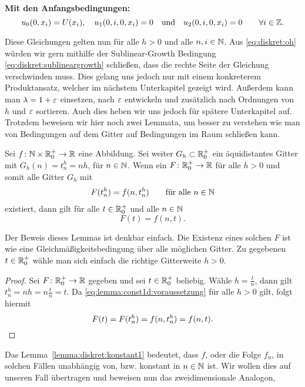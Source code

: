 \vspace{0.4cm}
\noindent \textbf{Mit den Anfangsbedingungen:}
\[ u_0(0, x_i) = U(x_i), \quad u_1(0, i, 0, x_i) = 0 \quad \text{und} \quad u_2(0, i, 0, x_i) = 0 \qquad \forall i \in \mathbb Z. \]

Diese Gleichungen gelten nun für alle $h > 0$ und alle $n, i \in \mathbb N$.
Aus \eqref{eq:diskret:oh} würden wir gern mithilfe der Sublinear-Growth Bedingung \eqref{eq:diskret:sublineargrowth} schließen, dass die rechte Seite der Gleichung verschwinden muss.
Dies gelang uns jedoch nur mit einem konkreterem Produktansatz, welcher im nächstem Unterkapitel gezeigt wird.
Außerdem kann man $\lambda = 1 + \varepsilon$ einsetzen, nach $\varepsilon$ entwickeln und zusätzlich nach Ordnungen von $h$ und $\varepsilon$ sortieren.
Auch dies heben wir uns jedoch für spätere Unterkapitel auf.
Trotzdem beweisen wir hier noch zwei Lemmata, um besser zu verstehen wie man von Bedingungen auf dem Gitter auf Bedingungen im Raum schließen kann.

\begin{lemma} \label{lemma:diskret:konstant1}
Sei $f\colon \mathbb N \times \mathbb R^+_0 \to \mathbb R$ eine Abbildung.
Sei weiter $G_h \subset \mathbb R^+_0$ ein äquidistantes Gitter mit $G_h(n) = t^h_n = n h$, für $n \in \mathbb N$.
Wenn ein $F\colon \mathbb R^+_0 \to \mathbb R$ für alle $h > 0$ und somit alle Gitter $G_h$ mit
\begin{align}\label{eq:lemma:const1d:voraussetzung}
F(t^h_n) = f(n, t^h_n) \qquad \text{für alle $n \in \mathbb N$}
\end{align}
existiert, dann gilt für alle $t \in \mathbb R^+_0$ und alle $n \in \mathbb N$
\[ F(t) = f(n, t). \]
\end{lemma}
Der Beweis dieses Lemmas ist denkbar einfach. Die Existenz eines solchen $F$ ist wie eine Gleichmäßigkeitsbedingung über alle möglichen Gitter.
Zu gegebenen $t \in \mathbb R^+_0$ wähle man sich einfach die richtige Gitterweite $h > 0$.
\begin{proof}
Sei $F\colon \mathbb R^+_0 \to \mathbb R$ gegeben und sei $t \in \mathbb R^+_0$ beliebig.
Wähle $h = \frac{t}{n}$, dann gilt $t^h_n = nh = n \frac{t}{n} = t$.
Da \eqref{eq:lemma:const1d:voraussetzung} für alle $h > 0$ gilt, folgt hiermit 
\[ F(t) = F(t^h_n) = f(n, t^h_n) = f(n, t). \qedhere \]
\end{proof}

Das Lemma~\ref{lemma:diskret:konstant1} bedeutet, dass $f$, oder die Folge $f_n$, in solchen Fällen unabhängig von, bzw. konstant in $n \in \mathbb N$ ist.
Wir wollen dies auf unseren Fall übertragen und beweisen nun das zweidimensionale Analogon, 

